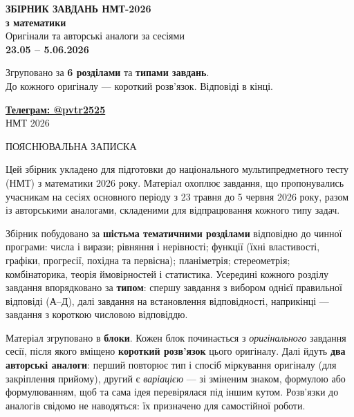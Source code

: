 \documentclass[12pt]{article}
\newcommand{\sectionTitle}[1]{%
\par\vspace{0.4cm}
\begin{tcolorbox}[colback=titleBg, colframe=titleBg, boxrule=0pt, arc=8pt,
    halign=center, fontupper=\Large\bfseries\color{mainGreen}]
#1
\end{tcolorbox}
\par\vspace{0.3cm}
}
\begin{document}
\thispagestyle{empty}
\vspace*{1.5cm}
\begin{center}
{\Huge\bfseries\color{mainGreen} ЗБІРНИК ЗАВДАНЬ НМТ-2026}\\[0.5cm]
{\Large\bfseries з математики}\\[0.8cm]
{\large Оригінали та авторські аналоги за сесіями}\\[0.2cm]
{\large \textbf{23.05 -- 5.06.2026}}\\[1.2cm]
\begin{tcolorbox}[colback=titleBg, colframe=mainGreen!60, boxrule=0.8pt, arc=6pt, width=0.8\textwidth, halign=center]
\large Згруповано за \textbf{6 розділами} та \textbf{типами завдань}.\\
До кожного оригіналу --- короткий розв'язок. Відповіді в кінці.
\end{tcolorbox}
\vfill
{\large\color{mainGreen}\textbf{\href{https://t.me/pvtr2525}{Телеграм: @pvtr2525}}}\\[0.3cm]
{\small\color{gray!70} НМТ 2026}
\end{center}
\clearpage

\sectionTitle{ПОЯСНЮВАЛЬНА ЗАПИСКА}

Цей збірник укладено для підготовки до національного мультипредметного тесту (НМТ) з математики 2026 року. Матеріал охоплює завдання, що пропонувались учасникам на сесіях основного періоду з 23 травня до 5 червня 2026 року, разом із авторськими аналогами, складеними для відпрацювання кожного типу задач.

Збірник побудовано за \textbf{шістьма тематичними розділами} відповідно до чинної програми: числа і вирази; рівняння і нерівності; функції (їхні властивості, графіки, прогресії, похідна та первісна); планіметрія; стереометрія; комбінаторика, теорія ймовірностей і статистика. Усередині кожного розділу завдання впорядковано за \textbf{типом}: спершу завдання з вибором однієї правильної відповіді (А--Д), далі завдання на встановлення відповідності, наприкінці --- завдання з короткою числовою відповіддю.

Матеріал згруповано в \textbf{блоки}. Кожен блок починається з \textit{оригінального} завдання сесії, після якого вміщено \textbf{короткий розв'язок} цього оригіналу. Далі йдуть \textbf{два авторські аналоги}: перший повторює тип і спосіб міркування оригіналу (для закріплення прийому), другий є \textit{варіацією} --- зі зміненим знаком, формулою або формулюванням, щоб та сама ідея перевірялася під іншим кутом. Розв'язки до аналогів свідомо не наводяться: їх призначено для самостійної роботи.
\end{document}
